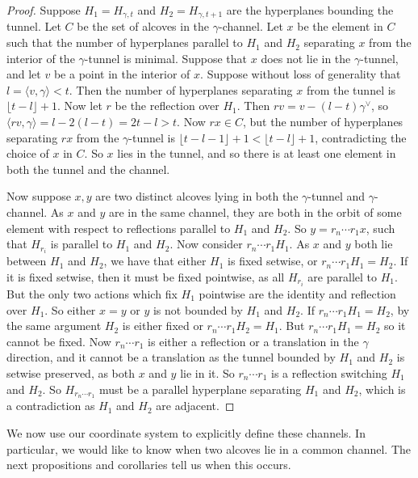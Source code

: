 \documentclass[11pt]{article}
\begin{document}
\begin{proof}
    Suppose $H_1=H_{\gamma,t}$ and $H_2=H_{\gamma,t+1}$ are the hyperplanes bounding the tunnel. Let $C$ be the set of alcoves in the $\gamma$-channel. Let $x$ be the element in $C$ such that the number of hyperplanes parallel to $H_1$ and $H_2$ separating $x$ from the interior of the $\gamma$-tunnel is minimal. Suppose that $x$ does not lie in the  $\gamma$-tunnel, and let $v$ be a point in the interior of $x$. Suppose without loss of generality that $l=\langle v,\gamma\rangle <t$. Then the number of hyperplanes separating $x$ from the tunnel is $\lfloor t-l\rfloor+1$. Now let $r$ be the reflection over $H_1$. Then $rv=v-(l-t)\gamma^\vee$, so $\langle rv, \gamma\rangle = l-2(l-t)=2t-l>t$. Now $rx\in C$, but the number of hyperplanes separating $rx$ from the $\gamma$-tunnel is $\lfloor t-l-1\rfloor+1<\lfloor t-l\rfloor+1$, contradicting the choice of $x$ in $C$. So $x$ lies in the tunnel, and so there is at least one element in both the tunnel and the channel.  
    
    
    Now suppose $x,y$ are two distinct alcoves lying in both the $\gamma$-tunnel and $\gamma$-channel. As $x$ and $y$ are in the same channel, they are both in the orbit of some element with respect to reflections parallel to $H_1$ and $H_2$. So $y=r_n\cdots r_1x$, such that $H_{r_i}$ is parallel to $H_1$ and $H_2$. Now consider $r_n\cdots r_1H_1$. As $x$ and $y$ both lie between $H_1$ and $H_2$, we have that either $H_1$ is fixed setwise, or $r_n\cdots r_1H_1=H_2$. If it is fixed setwise, then it must be fixed pointwise, as all $H_{r_i}$ are parallel to $H_1$. But the only two actions which fix $H_1$ pointwise are the identity and reflection over $H_1$. So either $x=y$ or $y$ is not bounded by $H_1$ and $H_2$. If $r_n\cdots r_1H_1=H_2$, by the same argument $H_2$ is either fixed or $r_n\cdots r_1 H_2=H_1$. But $r_n\cdots r_1H_1=H_2$ so it cannot be fixed. Now $r_n\cdots r_1$ is either a reflection or a translation in the $\gamma$ direction, and it cannot be a translation as the tunnel bounded by $H_1$ and $H_2$ is setwise preserved, as both $x$ and $y$ lie in it. So $r_n\cdots r_1$ is a reflection switching $H_1$ and $H_2$. So $H_{r_n\cdots r_1}$ must be a parallel hyperplane separating $H_1$ and $H_2$, which is a contradiction as $H_1$ and $H_2$ are adjacent. 
\end{proof}




We now use our coordinate system to explicitly define these channels. In particular, we would like to know when two alcoves lie in a common channel. The next propositions and corollaries tell us when this occurs.
\end{document}
